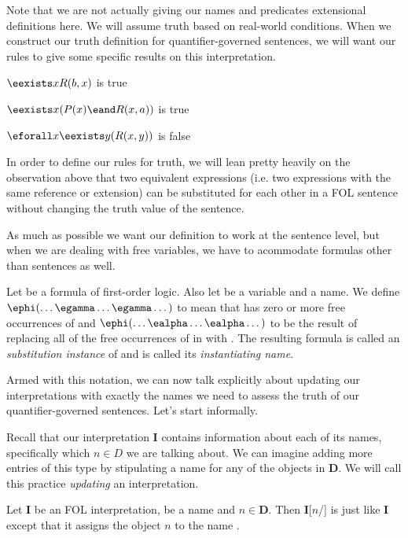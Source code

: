 Note that we are not actually giving our names and predicates extensional
definitions here. We will assume truth based on real-world conditions. When
we construct our truth definition for quantifier-governed sentences, we will
want our rules to give some specific results on this interpretation.

\begin{argument}
\item[ ] $\eexists xR(b,x)$ is true
\item[ ] $\eexists x(P(x)\eand R(x,a))$ is true
\item[ ] $\eforall x\eexists y(R(x,y))$ is false
\end{argument}

In order to define our rules for truth, we will lean pretty heavily on the
observation above that two equivalent expressions (i.e. two expressions with
the same reference or extension) can be substituted for each other in a FOL
sentence without changing the truth value of the sentence.


As much as possible we want our definition to work at the sentence level, but
when we are dealing with free variables, we have to acommodate formulas other
than sentences as well.

\begin{definition}
  \label{def:fol-substitution-instance}
  Let \ephi be a formula of first-order logic. Also let \egamma be a variable
  and \ealpha a name. We define
  $\ephi(\dots\egamma\dots\egamma\dots)$
  to mean
  that \ephi has zero or more free occurrences of \egamma and
  $\ephi(\dots\ealpha\dots\ealpha\dots)$
  to be the result of replacing all of
  the free occurrences of \egamma in \ephi with \ealpha. The resulting formula
  is called an \emph{substitution instance} of \ephi and \ealpha is called
  its \emph{instantiating name}.
\end{definition}

Armed with this notation, we can now talk explicitly about updating our
interpretations with exactly the names we need to assess the truth of our
quantifier-governed sentences. Let's start informally.

Recall that our interpretation \textbf{I} contains information about each of
its names, specifically which $n\in D$ we are talking about. We can imagine
adding more entries of this type by stipulating a name for any of the objects
in \textbf{D}. We will call this practice \emph{updating} an interpretation.

\begin{definition}
  \label{def:fol-update}
  Let \textbf{I} be an FOL interpretation, \ealpha be a name and
  $n\in\mathbf{D}$. Then \textbf{I}[$n$/\ealpha] is just like \textbf{I} except
  that it assigns the object $n$ to the name \ealpha.
\end{definition}

